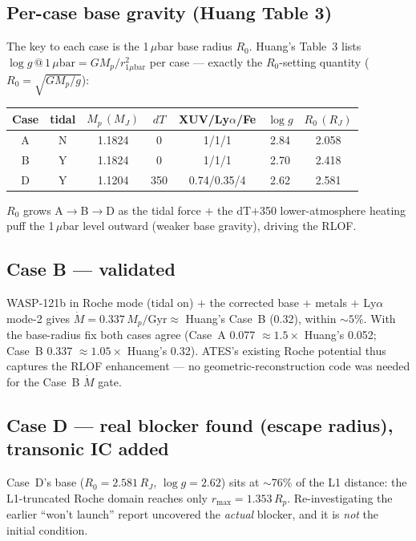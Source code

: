 \documentclass[english,a4paper]{kiseon_memo}
\begin{document}
\subsection{Per-case base gravity (Huang Table 3)}
The key to each case is the 1\,\(\mu\)bar base radius \(R_0\). Huang's Table~3 lists
\(\log g\,@\,1\,\mu\mathrm{bar}=GM_p/r_{1\mu\mathrm{bar}}^2\) per case --- exactly the
\(R_0\)-setting quantity (\(R_0=\sqrt{GM_p/g}\)):
\begin{center}
\begin{tabular}{ccccccc}
\hline
Case & tidal & \(M_p\,(M_J)\) & \(dT\) & XUV/Ly\(\alpha\)/Fe & \(\log g\) & \(R_0\,(R_J)\) \\
\hline
A & N & 1.1824 & 0   & 1/1/1        & 2.84 & 2.058 \\
B & Y & 1.1824 & 0   & 1/1/1        & 2.70 & 2.418 \\
D & Y & 1.1204 & 350 & 0.74/0.35/4  & 2.62 & 2.581 \\
\hline
\end{tabular}
\end{center}
\(R_0\) grows A\(\to\)B\(\to\)D as the tidal force $+$ the dT$+$350 lower-atmosphere
heating puff the 1\,\(\mu\)bar level outward (weaker base gravity), driving the RLOF.

\subsection{Case B --- validated}
WASP-121b in Roche mode (tidal on) $+$ the corrected base $+$ metals $+$ Ly\(\alpha\)
mode-2 gives \(\dot M=0.337\,M_p/\mathrm{Gyr}\approx\) Huang's Case~B (0.32), within
\(\sim5\%\). With the base-radius fix both cases agree (Case~A 0.077 \(\approx1.5\times\)
Huang's 0.052; Case~B 0.337 \(\approx1.05\times\) Huang's 0.32). ATES's existing Roche
potential thus captures the RLOF enhancement --- no geometric-reconstruction code was
needed for the Case~B \(\dot M\) gate.

\subsection{Case D --- real blocker found (escape radius), transonic IC added}
Case~D's base (\(R_0=2.581\,R_J\), \(\log g=2.62\)) sits at \(\sim\)76\% of the L1
distance: the L1-truncated Roche domain reaches only \(r_{\max}=1.353\,R_p\).
Re-investigating the earlier ``won't launch'' report uncovered the \emph{actual}
blocker, and it is \emph{not} the initial condition.
\end{document}
